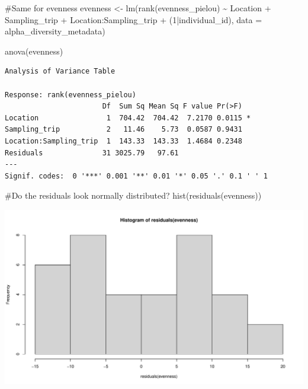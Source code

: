 \documentclass[
  letterpaper,
  DIV=11,
  numbers=noendperiod]{scrartcl}
\newenvironment{Shaded}{\begin{snugshade}}{\end{snugshade}}
\newcommand{\AttributeTok}[1]{\textcolor[rgb]{0.40,0.45,0.13}{#1}}
\newcommand{\CommentTok}[1]{\textcolor[rgb]{0.37,0.37,0.37}{#1}}
\newcommand{\DecValTok}[1]{\textcolor[rgb]{0.68,0.00,0.00}{#1}}
\newcommand{\FunctionTok}[1]{\textcolor[rgb]{0.28,0.35,0.67}{#1}}
\newcommand{\NormalTok}[1]{\textcolor[rgb]{0.00,0.23,0.31}{#1}}
\newcommand{\OtherTok}[1]{\textcolor[rgb]{0.00,0.23,0.31}{#1}}
\newcommand{\SpecialCharTok}[1]{\textcolor[rgb]{0.37,0.37,0.37}{#1}}
\begin{document}
\begin{Shaded}
\begin{Highlighting}[]
\CommentTok{\#Same for evenness}
\NormalTok{evenness }\OtherTok{\textless{}{-}} \FunctionTok{lm}\NormalTok{(}\FunctionTok{rank}\NormalTok{(evenness\_pielou) }\SpecialCharTok{\textasciitilde{}}\NormalTok{ Location }\SpecialCharTok{+}\NormalTok{ Sampling\_trip }\SpecialCharTok{+}\NormalTok{ Location}\SpecialCharTok{:}\NormalTok{Sampling\_trip }\SpecialCharTok{+}\NormalTok{ (}\DecValTok{1}\SpecialCharTok{|}\NormalTok{individual\_id), }\AttributeTok{data =}\NormalTok{ alpha\_diversity\_metadata)}

\FunctionTok{anova}\NormalTok{(evenness)}
\end{Highlighting}
\end{Shaded}

\begin{verbatim}
Analysis of Variance Table

Response: rank(evenness_pielou)
                       Df  Sum Sq Mean Sq F value Pr(>F)  
Location                1  704.42  704.42  7.2170 0.0115 *
Sampling_trip           2   11.46    5.73  0.0587 0.9431  
Location:Sampling_trip  1  143.33  143.33  1.4684 0.2348  
Residuals              31 3025.79   97.61                 
---
Signif. codes:  0 '***' 0.001 '**' 0.01 '*' 0.05 '.' 0.1 ' ' 1
\end{verbatim}

\begin{Shaded}
\begin{Highlighting}[]
\CommentTok{\#Do the residuals look normally distributed?}
\FunctionTok{hist}\NormalTok{(}\FunctionTok{residuals}\NormalTok{(evenness))}
\end{Highlighting}
\end{Shaded}

\includegraphics{code_files/figure-pdf/unnamed-chunk-4-3.pdf}
\end{document}
